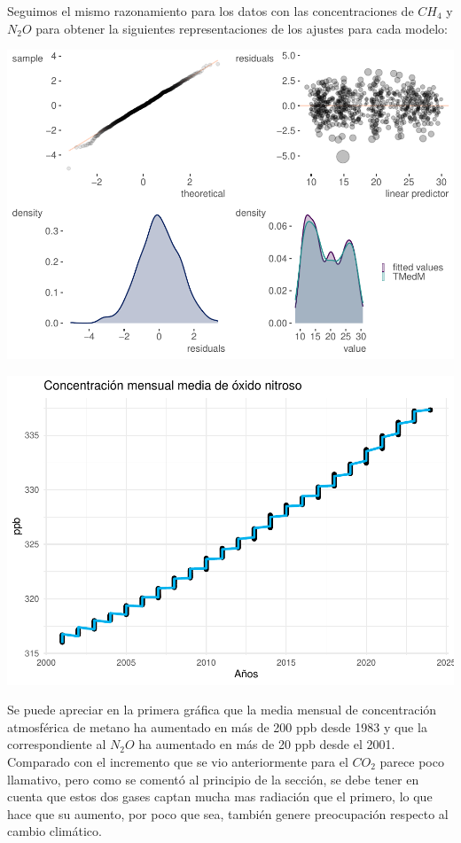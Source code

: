 \documentclass[12pt,a4paper,]{book}
\numberwithin{dummy}{section}
\theoremstyle{ocrenumbox}
\theoremstyle{blacknumex}
\theoremstyle{blacknumbox}
\theoremstyle{ocrenum}
\theoremstyle{ocrenum}
\begin{document}
Seguimos el mismo razonamiento para los datos con las concentraciones de
\(CH_4\) y \(N_2O\) para obtener la siguientes representaciones de los
ajustes para cada modelo:

\begin{center}\includegraphics[width=0.95\linewidth]{figurasR/unnamed-chunk-33-1} \end{center}

\begin{center}\includegraphics[width=0.95\linewidth]{figurasR/unnamed-chunk-33-2} \end{center}

Se puede apreciar en la primera gráfica que la media mensual de
concentración atmosférica de metano ha aumentado en más de 200 ppb desde
1983 y que la correspondiente al \(N_2O\) ha aumentado en más de 20 ppb
desde el 2001. Comparado con el incremento que se vio anteriormente para
el \(CO_2\) parece poco llamativo, pero como se comentó al principio de
la sección, se debe tener en cuenta que estos dos gases captan mucha mas
radiación que el primero, lo que hace que su aumento, por poco que sea,
también genere preocupación respecto al cambio climático.
\end{document}
